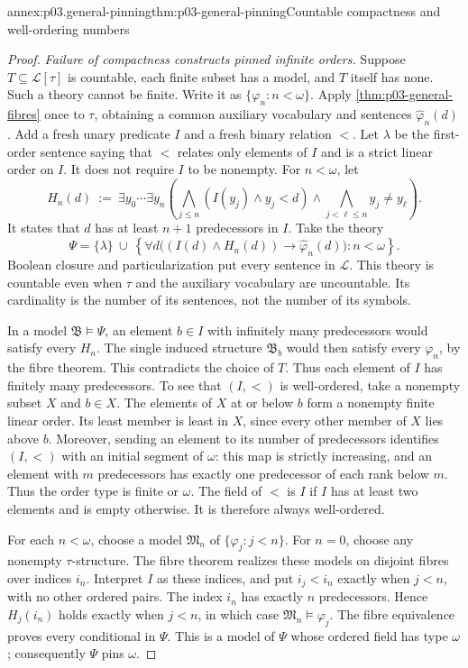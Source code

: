\begin{annexitem}{annex:p03.general-pinning}{thm:p03-general-pinning}{Countable compactness and well-ordering numbers}
\begin{proof}
\emph{Failure of compactness constructs pinned infinite orders.}
Suppose \(T\subseteq\mathscr L[\tau]\) is countable, each finite subset
has a model, and \(T\) itself has none. Such a theory cannot be finite.
Write it as \(\{\varphi_n:n<\omega\}\). Apply
\cref{thm:p03-general-fibres} once to \(\tau\), obtaining a common
auxiliary vocabulary and sentences \(\widehat\varphi_n(d)\).
Add a fresh unary predicate \(I\) and a fresh binary relation \(<\).
Let \(\lambda\) be the first-order sentence saying that \(<\) relates
only elements of \(I\) and is a strict linear order on \(I\).
It does not require \(I\) to be nonempty. For \(n<\omega\), let
\[
 H_n(d)\ :=\
 \exists y_0\cdots\exists y_n
 \left(\bigwedge_{j\leq n}(I(y_j)\land y_j<d)
       \land\bigwedge_{j<\ell\leq n} y_j\ne y_\ell\right).
\]
It states that \(d\) has at least \(n+1\) predecessors in \(I\).
Take the theory
\[
 \Psi=\{\lambda\}\ \cup\
 \left\{\forall d\bigl((I(d)\land H_n(d))\to
                    \widehat\varphi_n(d)\bigr):n<\omega\right\}.
\]
Boolean closure and particularization put every sentence in
\(\mathscr L\). This theory is countable even when \(\tau\) and the
auxiliary vocabulary are uncountable. Its cardinality is the number
of its sentences, not the number of its symbols.

In a model \(\mathfrak B\models\Psi\), an element \(b\in I\) with
infinitely many predecessors would satisfy every \(H_n\). The single
induced structure \(\mathfrak B_b\) would then satisfy every
\(\varphi_n\), by the fibre theorem. This contradicts the choice of
\(T\). Thus each element of \(I\) has finitely many predecessors.
To see that \((I,<)\) is well-ordered, take a nonempty subset \(X\)
and \(b\in X\). The elements of \(X\) at or below \(b\) form a
nonempty finite linear order. Its least member is least in \(X\),
since every other member of \(X\) lies above \(b\).
Moreover, sending an element to its number of predecessors identifies
\((I,<)\) with an initial segment of \(\omega\): this map is strictly
increasing, and an element with \(m\) predecessors has exactly one
predecessor of each rank below \(m\). Thus the order type is finite
or \(\omega\). The field of \(<\) is \(I\) if \(I\) has at least
two elements and is empty otherwise. It is therefore always well-ordered.

For each \(n<\omega\), choose a model \(\mathfrak M_n\) of
\(\{\varphi_j:j<n\}\). For \(n=0\), choose any nonempty
\(\tau\)-structure. The fibre theorem realizes these models on
disjoint fibres over indices \(i_n\). Interpret \(I\) as these
indices, and put \(i_j<i_n\) exactly when \(j<n\), with no other
ordered pairs. The index \(i_n\) has exactly \(n\) predecessors.
Hence \(H_j(i_n)\) holds exactly when \(j<n\), in which case
\(\mathfrak M_n\models\varphi_j\). The fibre equivalence proves
every conditional in \(\Psi\). This is a model of \(\Psi\) whose
ordered field has type \(\omega\); consequently \(\Psi\) pins
\(\omega\).


\end{proof}
\end{annexitem}
